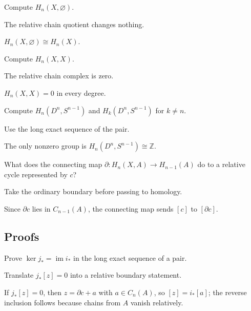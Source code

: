 \begin{exercise}\label{exr:viii19-ped-02}
Compute $H_n(X,\varnothing)$.
\end{exercise}
\begin{hint}
The relative chain quotient changes nothing.
\end{hint}
\begin{solution}
$H_n(X,\varnothing)\cong H_n(X)$.
\end{solution}

\begin{exercise}\label{exr:viii19-ped-03}
Compute $H_n(X,X)$.
\end{exercise}
\begin{hint}
The relative chain complex is zero.
\end{hint}
\begin{solution}
$H_n(X,X)=0$ in every degree.
\end{solution}

\begin{exercise}\label{exr:viii19-ped-04}
Compute $H_n(D^n,S^{n-1})$ and $H_k(D^n,S^{n-1})$ for $k\ne n$.
\end{exercise}
\begin{hint}
Use the long exact sequence of the pair.
\end{hint}
\begin{solution}
The only nonzero group is $H_n(D^n,S^{n-1})\cong\mathbb Z$.
\end{solution}

\begin{exercise}\label{exr:viii19-ped-05}
What does the connecting map $\partial:H_n(X,A)\to H_{n-1}(A)$ do to a relative cycle represented by $c$?
\end{exercise}
\begin{hint}
Take the ordinary boundary before passing to homology.
\end{hint}
\begin{solution}
Since $\partial c$ lies in $C_{n-1}(A)$, the connecting map sends $[c]$ to $[\partial c]$.
\end{solution}

\subsection*{Proofs}

\begin{exercise}\label{exr:viii19-ped-06}
Prove $\ker j_*=\operatorname{im} i_*$ in the long exact sequence of a pair.
\end{exercise}
\begin{hint}
Translate $j_*[z]=0$ into a relative boundary statement.
\end{hint}
\begin{solution}
If $j_*[z]=0$, then $z=\partial c+a$ with $a\in C_n(A)$, so $[z]=i_*[a]$; the reverse inclusion follows because chains from $A$ vanish relatively.
\end{solution}

